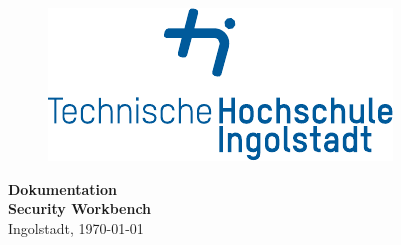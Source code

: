 
\begin{titlepage}

\phantom{tmpText}

\vspace{1cm}

\begin{figure}[h!]
\centering
\includegraphics[width=\textwidth]{bilder/thi_logo_cropped.pdf}
\end{figure}

  \begin{center}

    
    
    \textbf{{\large Dokumentation} \\[3ex]
    {\LARGE Security Workbench} \\[1ex]
    \vfill
    }
    \vfill
    Ingolstadt, \today
  \end{center}
\end{titlepage}
